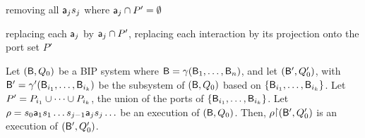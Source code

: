 \item \label{def.clause.bip.execution.projection.action} removing all $\mathsf{a}_j s_j$ where $\mathsf{a}_j \cap P' = \emptyset$   %

\item \label{def.clause.bip.execution.projection.port} replacing each $\mathsf{a}_j$ by $\mathsf{a}_j \cap P'$, \ie replacing each
interaction by its projection onto the port set $P'$ 

\en
\ed



\label{prop.bip.execution.projection}
Let $(\mathsf{B}, Q_0)$ be a BIP system where $\mathsf{B} = \gamma(\mathsf{B}_1,\dots,\mathsf{B}_n)$, and let
$(\mathsf{B}', Q'_0)$, with $\mathsf{B}' = \gamma'(\mathsf{B}_{i_1},\dots,\mathsf{B}_{i_k})$ be the subsystem of $(\mathsf{B}, Q_0)$ based on $\{ \mathsf{B}_{i_1},\dots,\mathsf{B}_{i_k} \}$.
Let $P' = P_{i_1} \cup \cdots \cup P_{i_k}$,  \ie the union of the ports of $\{ \mathsf{B}_{i_1},\dots,\mathsf{B}_{i_k} \}$.
Let $\rho = s_0 \mathsf{a}_1 s_1 \ldots s_{j-1} \mathsf{a}_j s_j \ldots$ be an execution of $(\mathsf{B}, Q_0)$. 
Then, $\rho \pj (\B', Q'_0)$ is an execution of $(\mathsf{B}', Q'_0)$.
\ep
